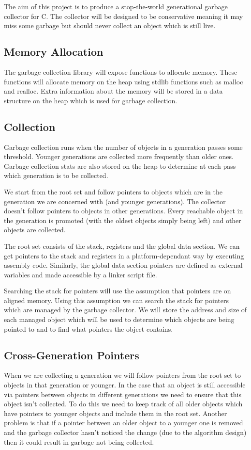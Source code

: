 \documentclass[12pt, a4]{article}
\begin{document}
The aim of this project is to produce a stop-the-world generational garbage collector for C. The collector will be designed to be conservative meaning it may miss some garbage but should never collect an object which is still live.

\subsection*{Memory Allocation}
The garbage collection library will expose functions to allocate memory. These functions will allocate memory on the heap using stdlib functions such as malloc and realloc. Extra information about the memory will be stored in a data structure on the heap which is used for garbage collection.

\subsection*{Collection}
Garbage collection runs when the number of objects in a generation passes some threshold. Younger generations are collected more frequently than older ones. Garbage collection stats are also stored on the heap to determine at each pass which generation is to be collected.

We start from the root set and follow pointers to objects which are in the generation we are concerned with (and younger generations). The collector doesn't follow pointers to objects in other generations. Every reachable object in the generation is promoted (with the oldest objects simply being left) and other objects are collected.

The root set consists of the stack, registers and the global data section. We can get pointers to the stack and registers in a platform-dependant way by executing assembly code. Similarly, the global data section pointers are defined as external variables and made accessible by a linker script file.

Searching the stack for pointers will use the assumption that pointers are on aligned memory. Using this assumption we can search the stack for pointers which are managed by the garbage collector. We will store the address and size of each managed object which will be used to determine which objects are being pointed to and to find what pointers the object contains.

\subsection*{Cross-Generation Pointers}
When we are collecting a generation we will follow pointers from the root set to objects in that generation or younger. In the case that an object is still accessible via pointers between objects in different generations we need to ensure that this object isn't collected. To do this we need to keep track of all older objects which have pointers to younger objects and include them in the root set. Another problem is that if a pointer between an older object to a younger one is removed and the garbage collector hasn't noticed the change (due to the algorithm design) then it could result in garbage not being collected.
\end{document}

